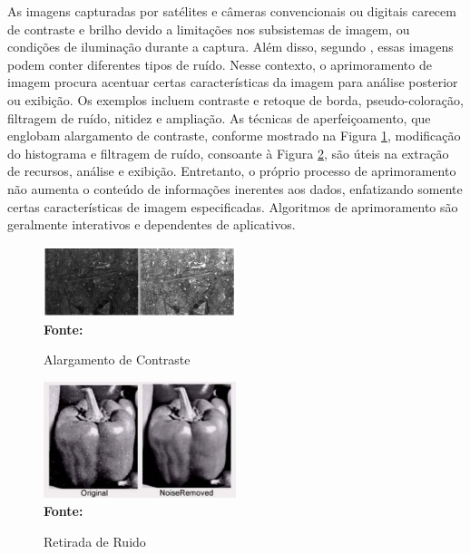 As imagens capturadas por satélites e câmeras convencionais ou digitais carecem de contraste e brilho devido a limitações nos subsistemas de imagem, ou condições de iluminação durante a captura. Além disso, segundo , essas imagens podem conter diferentes tipos de ruído. Nesse contexto, o aprimoramento de imagem procura acentuar certas características da imagem para análise posterior ou exibição. Os exemplos incluem contraste e retoque de borda, pseudo-coloração, filtragem de ruído, nitidez e ampliação. As técnicas de aperfeiçoamento, que englobam alargamento de contraste, conforme mostrado na Figura \ref{fig:contraste}, modificação do histograma e filtragem de ruído, consoante à Figura \ref{fig:ruido}, são úteis na extração de recursos, análise e exibição. Entretanto, o próprio processo de aprimoramento não aumenta o conteúdo de informações inerentes aos dados, enfatizando somente certas características de imagem especificadas. Algoritmos de aprimoramento são geralmente interativos e dependentes de aplicativos.

 \begin{figure}[ht]
 	\centering	
 	\caption[\hspace{0.1cm}Grade Computacional.]{Alargamento de Contraste}
 	\vspace{-0.4cm}
 	\includegraphics[width=0.5\textwidth]{figuras/Alargamento de Contraste.png}
 	\captionsetup{justification=centering}
	\vspace{-0.2cm}
	\\\textbf{\footnotesize Fonte: \cite{techniques} }
	\label{fig:contraste}
\end{figure}

 \begin{figure}[ht]
 	\centering	
 	\caption[\hspace{0.1cm}Grade Computacional.]{Retirada de Ruido}
 	\vspace{-0.4cm}
 	\includegraphics[width=0.5\textwidth]{figuras/Retirada de Ruido.png}
 	\captionsetup{justification=centering}
	\vspace{-0.1cm}
	\\\textbf{\footnotesize Fonte: \cite{techniques} }
	\label{fig:ruido}
\end{figure}



